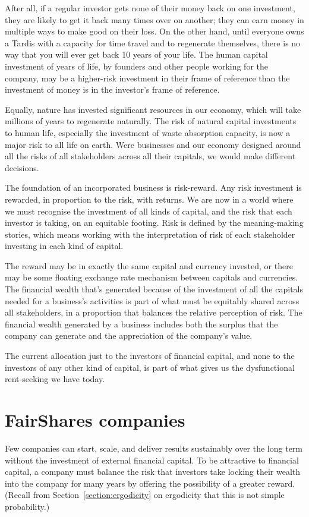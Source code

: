 After all, if a regular investor gets none of their money back on one investment, they are likely to get it back many times over on another; they can earn money in multiple ways to make good on their loss. On the other hand, until everyone owns a Tardis with a capacity for time travel and to regenerate themselves, there is no way that you will ever get back 10 years of your life. The human capital investment of years of life, by founders and other people working for the company, may be a higher-risk investment in their frame of reference than the investment of money is in the investor’s frame of reference.


Equally, nature has invested significant resources in our economy, which will take millions of years to regenerate naturally. The risk of natural capital investments to human life, especially the investment of waste absorption capacity, is now a major risk to all life on earth. Were businesses and our economy designed around all the risks of all stakeholders across all their capitals, we would make different decisions.


The foundation of an incorporated business is risk-reward. Any risk investment is rewarded, in proportion to the risk, with returns. We are now in a world where we must recognise the investment of all kinds of capital, and the risk that each investor is taking, on an equitable footing. Risk is defined by the meaning\hyp{}making stories, which means working with the interpretation of risk of each stakeholder investing in each kind of capital. 


The reward may be in exactly the same capital and currency invested, or there may be some floating exchange rate mechanism between capitals and currencies. The financial wealth that’s generated because of the investment of all the capitals needed for a business’s activities is part of what must be equitably shared across all stakeholders, in a proportion that balances the relative perception of risk. The financial wealth generated by a business includes both the surplus that the company can generate and the appreciation of the company's value.


The current allocation just to the investors of financial capital, and none to the investors of any other kind of capital, is part of what gives us the dysfunctional rent-seeking we have today.


\section{FairShares companies}
\label{section:fairshares-companies}
Few companies can start, scale, and deliver results sustainably over the long term without the investment of external financial capital. To be attractive to financial capital, a company must balance the risk that investors take locking their wealth into the company for many years by offering the possibility of a greater reward. (Recall from Section~\ref{section:ergodicity} on ergodicity\cite{peters-ergodicity-economics} that this is not simple probability.) 


